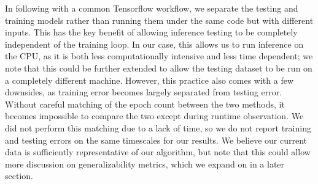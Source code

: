 In following with a common Tensorflow workflow, we separate the testing and training models rather than running them under the same code but with different inputs.
This has the key benefit of allowing inference testing to be completely independent of the training loop.
In our case, this allows us to run inference on the CPU, as it is both less computationally intensive and less time dependent; we note that this could be further extended to allow the testing dataset to be run on a completely different machine.
However, this practice also comes with a few downsides, as training error becomes largely separated from testing error.
Without careful matching of the epoch count between the two methods, it becomes impossible to compare the two except during runtime observation.
We did not perform this matching due to a lack of time, so we do not report training and testing errors on the same timescales for our results.
We believe our current data is sufficiently representative of our algorithm, but note that this could allow more discussion on generalizability metrics, which we expand on in a later section.